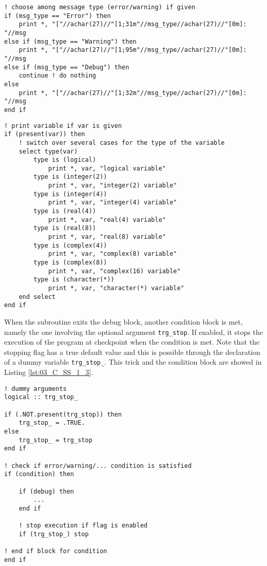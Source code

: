 \documentclass[pra, onecolumn, notitlepage, floats, 11pt]{revtex4-1}
\newcommand{\code}[2][black]{\color{#1}\texttt{#2}}
\begin{document}
\begin{lstlisting}[frame=single,label={lst:03_C_SS_1_1},caption={Implementation of message printing along with message type. Color and style from bash scripting are employed.}]
! choose among message type (error/warning) if given
if (msg_type == "Error") then
    print *, "["//achar(27)//"[1;31m"//msg_type//achar(27)//"[0m]: "//msg
else if (msg_type == "Warning") then
    print *, "["//achar(27)//"[1;95m"//msg_type//achar(27)//"[0m]: "//msg
else if (msg_type == "Debug") then
    continue ! do nothing
else
    print *, "["//achar(27)//"[1;32m"//msg_type//achar(27)//"[0m]: "//msg
end if
\end{lstlisting}

\begin{lstlisting}[frame=single,label={lst:03_C_SS_1_2},caption={Implementation of variable printing through case select block.}]
! print variable if var is given
if (present(var)) then
    ! switch over several cases for the type of the variable
    select type(var)
        type is (logical)
            print *, var, "logical variable"
        type is (integer(2))
            print *, var, "integer(2) variable"
        type is (integer(4))
            print *, var, "integer(4) variable"
        type is (real(4))
            print *, var, "real(4) variable"
        type is (real(8))
            print *, var, "real(8) variable"
        type is (complex(4))
            print *, var, "complex(8) variable"
        type is (complex(8))
            print *, var, "complex(16) variable"
        type is (character(*))
            print *, var, "character(*) variable"
    end select
end if
\end{lstlisting}

When the subroutine exits the debug block, another condition block is met, namely the one involving the optional argument \code{trg\_stop}. If enabled, it stops the execution of the program at checkpoint when the condition is met. Note that the stopping flag has a true default value and this is possible through the declaration of a dummy variable \code{trg\_stop\_}. This trick and the condition block are showed in Listing \ref{lst:03_C_SS_1_3}.

\begin{lstlisting}[frame=single,label={lst:03_C_SS_1_3},caption={Implementation of the stopping block along with default value.}]
! dummy arguments
logical :: trg_stop_

if (.NOT.present(trg_stop)) then
    trg_stop_ = .TRUE.
else
    trg_stop_ = trg_stop
end if

! check if error/warning/... condition is satisfied
if (condition) then

    if (debug) then
        ...
    end if

    ! stop execution if flag is enabled
    if (trg_stop_) stop

! end if block for condition
end if
\end{lstlisting}
\end{document}
